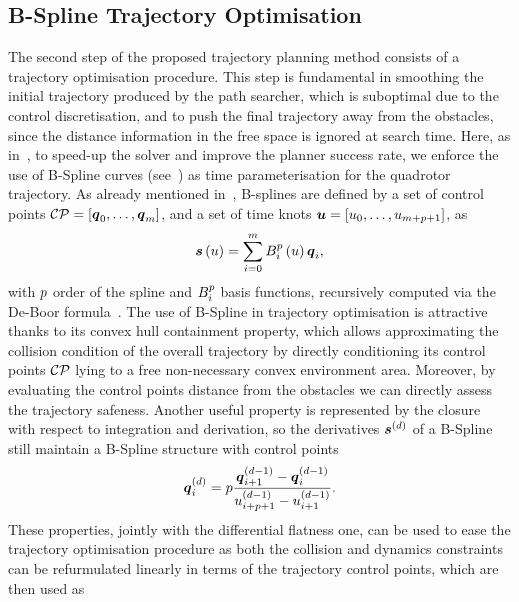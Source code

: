 \subsection{B-Spline Trajectory Optimisation}
The second step of the proposed trajectory planning method consists of a trajectory optimisation procedure.
This step is fundamental in smoothing the initial trajectory produced by the path searcher, which is suboptimal due to the control discretisation,
and to push the final trajectory away from the obstacles, since the distance information in the free space is ignored at search time.
Here, as in~, to speed-up the solver and improve the planner success rate, we enforce the use of
B-Spline curves (see~) as time parameterisation for the quadrotor trajectory.
As already mentioned in~, B-splines are defined by a set of control points
$\mathcal{CP} = \left[ \boldsymbol{q}_0, \dots, \boldsymbol{q}_{m} \right]$, and a set of time knots
$\boldsymbol{u} = \left[ u_0, \dots, u_{m + p + 1} \right]$, as
\begin{equation*}
	\boldsymbol{s} \left( u \right) = \sum_{i=0}^m B_i^p \left( u \right) \boldsymbol{q}_i,
\end{equation*}
with $p$ order of the spline and $B_i^p$ basis functions, recursively computed via the De-Boor formula~\cite{de1978practical}.
The use of B-Spline in trajectory optimisation is attractive thanks to its convex hull containment property, which allows approximating
the collision condition of the overall trajectory by directly conditioning its control points $\mathcal{CP}$ lying to a free non-necessary convex
environment area. Moreover, by evaluating the control points distance from the obstacles we can directly assess the trajectory safeness.
Another useful property is represented by the closure with respect to integration and derivation, so the derivatives $\boldsymbol{s}^{\left( d \right)}$
of a B-Spline still maintain a B-Spline structure with control points
\begin{equation*}
	\boldsymbol{q}_i^{\left( d \right)} = p \frac{\boldsymbol{q}_{i+1}^{\left( d-1 \right)} - \boldsymbol{q}_i^{\left( d-1 \right)}}{u^{\left( d-1 \right)}_{i+p+1} - u^{\left( d-1 \right)}_{i+1}}.
\end{equation*}
These properties, jointly with the differential flatness one, can be used to ease the trajectory optimisation procedure as both the
collision and dynamics constraints can be refurmulated linearly in terms of the trajectory control points, which are then used as
